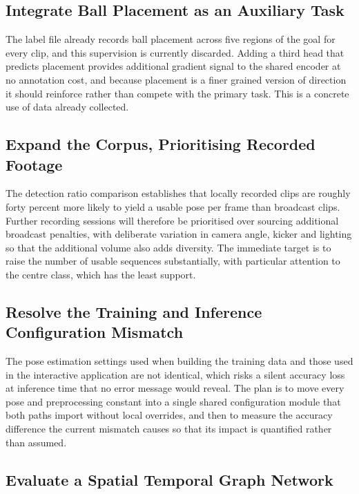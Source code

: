\subsection{Integrate Ball Placement as an Auxiliary Task}

The label file already records ball placement across five regions of the goal for every clip, and this supervision is currently discarded. Adding a third head that predicts placement provides additional gradient signal to the shared encoder at no annotation cost, and because placement is a finer grained version of direction it should reinforce rather than compete with the primary task. This is a concrete use of data already collected.

\subsection{Expand the Corpus, Prioritising Recorded Footage}

The detection ratio comparison establishes that locally recorded clips are roughly forty percent more likely to yield a usable pose per frame than broadcast clips. Further recording sessions will therefore be prioritised over sourcing additional broadcast penalties, with deliberate variation in camera angle, kicker and lighting so that the additional volume also adds diversity. The immediate target is to raise the number of usable sequences substantially, with particular attention to the centre class, which has the least support.

\subsection{Resolve the Training and Inference Configuration Mismatch}

The pose estimation settings used when building the training data and those used in the interactive application are not identical, which risks a silent accuracy loss at inference time that no error message would reveal. The plan is to move every pose and preprocessing constant into a single shared configuration module that both paths import without local overrides, and then to measure the accuracy difference the current mismatch causes so that its impact is quantified rather than assumed.

\subsection{Evaluate a Spatial Temporal Graph Network}

